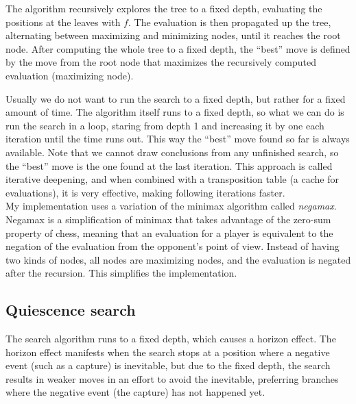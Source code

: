 The algorithm recursively explores the tree to a fixed depth, evaluating the positions at the leaves with $f$. The evaluation is then propagated up the tree, alternating between maximizing and minimizing nodes, until it reaches the root node. After computing the whole tree to a fixed depth, the \enquote{best} move is defined by the move from the root node that maximizes the recursively computed evaluation (maximizing node).

Usually we do not want to run the search to a fixed depth, but rather for a fixed amount of time. The algorithm itself runs to a fixed depth, so what we can do is run the search in a loop, staring from depth 1 and increasing it by one each iteration until the time runs out. This way the \enquote{best} move found so far is always available. Note that we cannot draw conclusions from any unfinished search, so the \enquote{best} move is the one found at the last iteration. This approach is called iterative deepening, and when combined with a transposition table (a cache for evaluations), it is very effective, making following iterations faster. \\

My implementation uses a variation of the minimax algorithm called \textit{negamax}. Negamax is a simplification of minimax that takes advantage of the zero-sum property of chess, meaning that an evaluation for a player is equivalent to the negation of the evaluation from the opponent's point of view. Instead of having two kinds of nodes, all nodes are maximizing nodes, and the evaluation is negated after the recursion. This simplifies the implementation.

\subsection{Quiescence search}

The search algorithm runs to a fixed depth, which causes a horizon effect. The horizon effect manifests when the search stops at a position where a negative event (such as a capture) is inevitable, but due to the fixed depth, the search results in weaker moves in an effort to avoid the inevitable, preferring branches where the negative event (the capture) has not happened yet.

